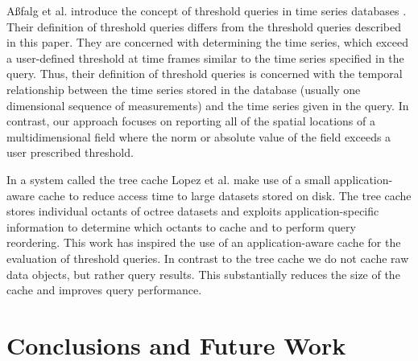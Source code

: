 \documentclass{sig-alternate}
\begin{document}
A{\ss}falg et al. introduce the concept of threshold queries in time series databases \cite{Asfalg}. Their definition of threshold queries differs from the threshold
queries described in this paper. They are concerned with determining the time series, which exceed a user-defined threshold at time frames similar to
the time series specified in the query. Thus, their definition of threshold queries is concerned with the temporal relationship between the time series
stored in the database (usually one dimensional sequence of measurements) and the time series given in the query. In contrast, our approach focuses on
reporting all of the spatial locations of a multidimensional field where the norm or absolute value of the field exceeds a user prescribed threshold.

In a system called the tree cache Lopez et al. \cite{Lopez} make use of a small application-aware cache to reduce access time to large datasets stored on
disk. The tree cache stores individual octants of octree datasets and exploits application-specific information to determine which octants to cache and to 
perform query reordering. This work has inspired the use of an application-aware cache for the evaluation of threshold queries. In contrast to the tree cache
we do not cache raw data objects, but rather query results. This substantially reduces the size of the cache and improves query performance.

\section{Conclusions and Future Work}

\end{document}
